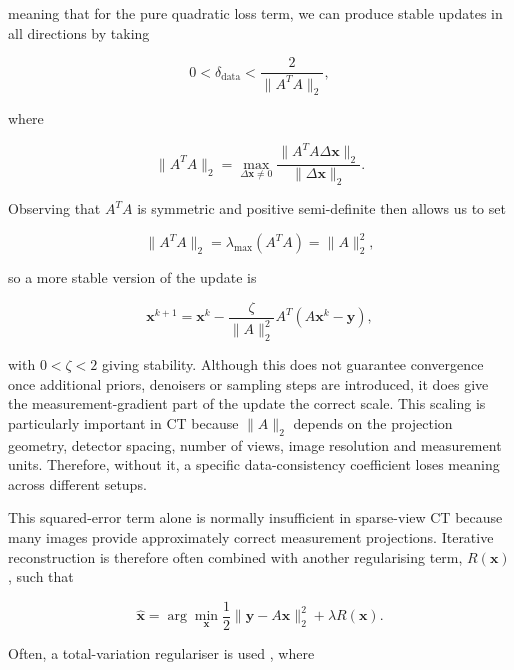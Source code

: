 meaning that for the pure quadratic loss term, we can produce stable updates in all directions by taking

\begin{equation}
0<\delta_{\mathrm{data}}<\frac{2}{\|A^TA\|_2},
\label{eq:data_step_stability}
\end{equation}

where 

\begin{equation}
\|A^TA\|_2
=
\max_{\Delta\mathbf{x}\neq 0}
\frac{
\|A^TA\Delta\mathbf{x}\|_2
}{
\|\Delta\mathbf{x}\|_2
}.
\label{eq:operator_norm_definition}
\end{equation}

Observing that $A^TA$ is symmetric and positive semi-definite then allows us to set 

\begin{equation}
\|A^TA\|_2
=
\lambda_{\max}(A^TA)
=
\|A\|_2^2,
\label{eq:operator_norm_relation}
\end{equation}

so a more stable version of the update is

\begin{equation}
\mathbf{x}^{k+1}
=
\mathbf{x}^k
-
\frac{\zeta}{\|A\|_2^2}
A^T(A\mathbf{x}^k-\mathbf{y}),
\label{eq:scaled_data_consistency_update}
\end{equation}

with $0<\zeta<2$ giving stability. Although this does not guarantee convergence once additional priors, denoisers or sampling steps are introduced, it does give the measurement-gradient part of the update the correct scale. This scaling is particularly important in CT because $\|A\|_2$ depends on the projection geometry, detector spacing, number of views, image resolution and measurement units. Therefore, without it, a specific data-consistency coefficient loses meaning across different setups.

This squared-error term alone is normally insufficient in sparse-view CT because many images provide approximately correct measurement projections. Iterative reconstruction is therefore often combined with another regularising term, $R(\mathbf{x})$, such that

\begin{equation}
\hat{\mathbf{x}}
=
\arg\min_{\mathbf{x}}
\frac{1}{2}
\|\mathbf{y}-A\mathbf{x}\|_2^2
+
\lambda R(\mathbf{x}).
\label{eq:regularised_reconstruction_objective}
\end{equation}

Often, a total-variation regulariser is used \cite{}, where

